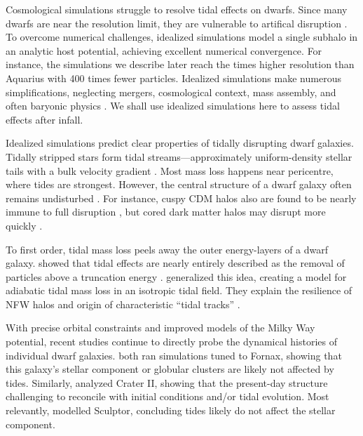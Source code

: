 Cosmological simulations struggle to resolve tidal effects on dwarfs.
Since many dwarfs are near the resolution limit, they are vulnerable to
artifical disruption
\citep[e.g.,][]{vandenbosch+2018, santos-santos+2025}. To overcome
numerical challenges, idealized simulations model a single subhalo in an
analytic host potential, achieving excellent numerical convergence. For
instance, the simulations we describe later reach the times higher
resolution than Aquarius \citep{springel+2008} with 400 times fewer
particles. Idealized simulations make numerous simplifications,
neglecting mergers, cosmological context, mass assembly, and often
baryonic physics
\citep[e.g.,][]{hayashi+2003, bullock+johnston2005, klimentowski+2009, ogiya+2019}.
We shall use idealized simulations here to assess tidal effects after
infall.

Idealized simulations predict clear properties of tidally disrupting
dwarf galaxies. Tidally stripped stars form tidal
streams---approximately uniform-density stellar tails with a bulk
velocity gradient
\citep[e.g.,][]{moore+davis1994, johnston+spergel+hernquist1995, read+2006}.
Most mass loss happens near pericentre, where tides are strongest.
However, the central structure of a dwarf galaxy often remains
undisturbed \citep{oh+lin+aarseth1995, piatek+pryor1995}. For instance,
cuspy CDM halos also are found to be nearly immune to full disruption
\citep{EP2020}, but cored dark matter halos may disrupt more quickly
\citep[e.g.,][]{penarrubia+2010, errani+2023a}.

To first order, tidal mass loss peels away the outer energy-layers of a
dwarf galaxy.
\citet{drakos+taylor+benson2020, drakos+taylor+benson2022, amorisco2021}
showed that tidal effects are nearly entirely described as the removal
of particles above a truncation energy \citep[see
also][]{choi+weinberg+katz2009}. \citet{stucker+2023} generalized this
idea, creating a model for adiabatic tidal mass loss in an isotropic
tidal field. They explain the resilience of NFW halos and origin of
characteristic ``tidal tracks'' \citep[as observed
in][]{PNM2008, green+vandenbosch2019, EN2021}.

With precise orbital constraints and improved models of the Milky Way
potential, recent studies continue to directly probe the dynamical
histories of individual dwarf galaxies.
\citet{borukhovetskaya+2022, dicintio+2024} both ran simulations tuned
to Fornax, showing that this galaxy's stellar component or globular
clusters are likely not affected by tides. Similarly,
\citet{borukhovetskaya+2022a} analyzed Crater II, showing that the
present-day structure challenging to reconcile with \LCDM{} initial
conditions and/or tidal evolution. Most relevantly, \citet{iorio+2019}
modelled Sculptor, concluding tides likely do not affect the stellar
component.

